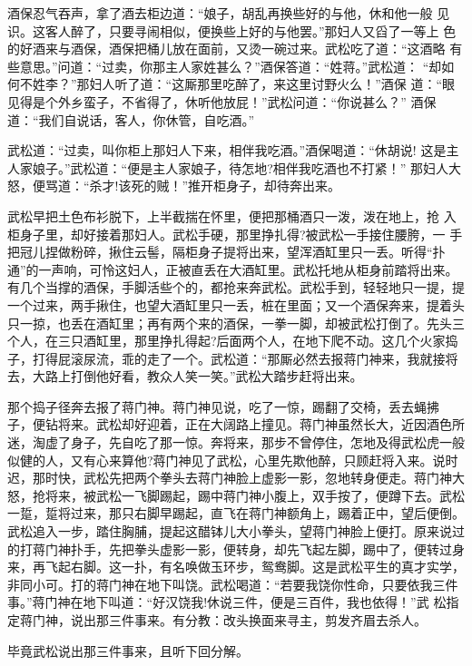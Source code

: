 酒保忍气吞声，拿了酒去柜边道：“娘子，胡乱再换些好的与他，休和他一般
见识。这客人醉了，只要寻闹相似，便换些上好的与他罢。”那妇人又舀了一等上
色的好酒来与酒保，酒保把桶儿放在面前，又烫一碗过来。武松吃了道：“这酒略
有些意思。”问道：“过卖，你那主人家姓甚么？”酒保答道：“姓蒋。”武松道：
“却如何不姓李？”那妇人听了道：“这厮那里吃醉了，来这里讨野火么！”酒保
道：“眼见得是个外乡蛮子，不省得了，休听他放屁！”武松问道：“你说甚么？”
酒保道：“我们自说话，客人，你休管，自吃酒。”

武松道：“过卖，叫你柜上那妇人下来，相伴我吃酒。”酒保喝道：“休胡说!
这是主人家娘子。”武松道：“便是主人家娘子，待怎地?相伴我吃酒也不打紧！”
那妇人大怒，便骂道：“杀才!该死的贼！”推开柜身子，却待奔出来。

武松早把土色布衫脱下，上半截揣在怀里，便把那桶酒只一泼，泼在地上，抢
入柜身子里，却好接着那妇人。武松手硬，那里挣扎得?被武松一手接住腰胯，一
手把冠儿捏做粉碎，揪住云髻，隔柜身子提将出来，望浑酒缸里只一丢。听得“扑
通”的一声响，可怜这妇人，正被直丢在大酒缸里。武松托地从柜身前踏将出来。
有几个当撑的酒保，手脚活些个的，都抢来奔武松。武松手到，轻轻地只一提，提
一个过来，两手揪住，也望大酒缸里只一丢，桩在里面；又一个酒保奔来，提着头
只一掠，也丢在酒缸里；再有两个来的酒保，一拳一脚，却被武松打倒了。先头三
个人，在三只酒缸里，那里挣扎得起?后面两个人，在地下爬不动。这几个火家捣
子，打得屁滚尿流，乖的走了一个。武松道：“那厮必然去报蒋门神来，我就接将
去，大路上打倒他好看，教众人笑一笑。”武松大踏步赶将出来。

那个捣子径奔去报了蒋门神。蒋门神见说，吃了一惊，踢翻了交椅，丢去蝇拂
子，便钻将来。武松却好迎着，正在大阔路上撞见。蒋门神虽然长大，近因酒色所
迷，淘虚了身子，先自吃了那一惊。奔将来，那步不曾停住，怎地及得武松虎一般
似健的人，又有心来算他?蒋门神见了武松，心里先欺他醉，只顾赶将入来。说时
迟，那时快，武松先把两个拳头去蒋门神脸上虚影一影，忽地转身便走。蒋门神大
怒，抢将来，被武松一飞脚踢起，踢中蒋门神小腹上，双手按了，便蹲下去。武松
一踅，踅将过来，那只右脚早踢起，直飞在蒋门神额角上，踢着正中，望后便倒。
武松追入一步，踏住胸脯，提起这醋钵儿大小拳头，望蒋门神脸上便打。原来说过
的打蒋门神扑手，先把拳头虚影一影，便转身，却先飞起左脚，踢中了，便转过身
来，再飞起右脚。这一扑，有名唤做玉环步，鸳鸯脚。这是武松平生的真才实学，
非同小可。打的蒋门神在地下叫饶。武松喝道：“若要我饶你性命，只要依我三件
事。”蒋门神在地下叫道：“好汉饶我!休说三件，便是三百件，我也依得！”武
松指定蒋门神，说出那三件事来。有分教：改头换面来寻主，剪发齐眉去杀人。

毕竟武松说出那三件事来，且听下回分解。